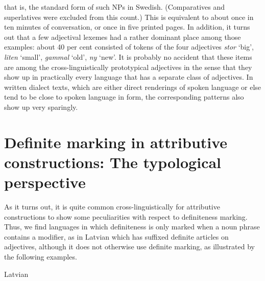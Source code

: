 \begin{styleBodyTextFirst}
that is, the standard form of such NPs in Swedish. (Comparatives and superlatives were excluded from this count.) This is equivalent to about once in ten minutes of conversation, or once in five printed pages. In addition, it turns out that a few adjectival lexemes had a rather dominant place among those examples: about 40 per cent consisted of tokens of the four adjectives \textit{stor }‘big’, \textit{liten} ‘small’, \textit{gammal} ‘old’, \textit{ny} ‘new’. It is probably no accident that these items are among the cross-linguistically prototypical adjectives in the sense that they show up in practically every language that has a separate class of adjectives. In written dialect texts, which are either direct renderings of spoken language or else tend to be close to spoken language in form, the corresponding patterns also show up very sparingly.

\end{styleBodyTextFirst}

\section{\rmfamily\bfseries Definite marking in attributive constructions: The typological perspective}

\begin{styleBodyTextFirst}
As it turns out, it is quite common cross-linguistically for attributive constructions to show some peculiarities with respect to definiteness marking. Thus, we find languages in which definiteness is only marked when a noun phrase contains a modifier, as in Latvian which has suffixed definite articles on adjectives, although it does not otherwise use definite marking, as illustrated by the following examples. 

\end{styleBodyTextFirst}

\begin{listWWNumileveli}
\item 

\begin{styleExample}
Latvian

\end{styleExample}

\end{listWWNumileveli}

\begin{listWWNumlviiileveli}
\item 

\end{listWWNumlviiileveli}

